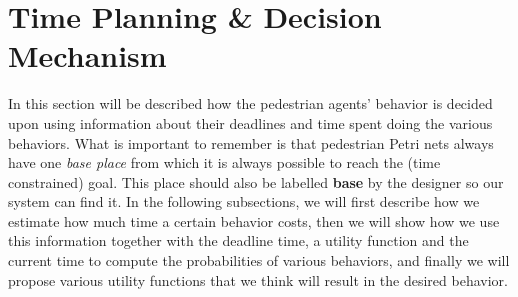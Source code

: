 \documentclass[11pt, a4paper]{book}
\begin{document}


\section{Time Planning \& Decision Mechanism}
\label{timeplanning}
In this section will be described how the pedestrian agents' behavior is decided upon using information about their deadlines and time spent doing the various behaviors.
What is important to remember is that pedestrian Petri nets always have one \emph{base place} from which it is always possible to reach the (time constrained) goal. This place should also be labelled \textbf{base} by the designer so our system can find it. In the following subsections, we will first describe how we estimate how much time a certain behavior costs, then we will show how we use this information together with the deadline time, a utility function and the current time to compute the probabilities of various behaviors, and finally we will propose various utility functions that we think will result in the desired behavior.
\end{document}
